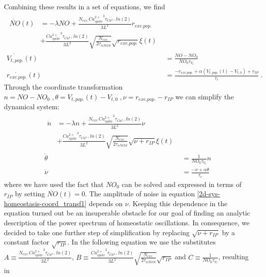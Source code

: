 \documentclass[10pt,a4paper]{article}
\begin{document}
Combining these results in a set of equations, we find
\begin{align}
\begin{split}
\dot{NO}(t) &= - \lambda NO + \frac{ N_{exc.} {Ca^{2+}_{spike}}^3 \tau_{Ca^{2+}}ln(2)}{3 L^2}r_{exc.pop.} \\
&+ \frac{{Ca^{2+}_{spike}}^3 {\tau_{Ca^{2+}}} ln(2)}{3L^2}\sqrt{\frac{N_{exc.}}{2 \tau_{nNOS}}}\sqrt{r_{exc.pop.}}\xi (t)
\end{split}\label{2d-sys-homeostasis1}\\
\dot{V_{t,pop.}}(t) &= \frac{NO-NO_0}{NO_0 \tau_{V_t}} \label{2d-sys-homeostasis2} \\
\dot{r_{exc.pop.}}(t) &= \frac{-r_{exc.pop.}+\alpha(V_{t,pop.}(t)-V_{t,0}) + r_{IP}}{\tau_r}\;. \label{2d-sys-homeostasis3}
\end{align}
Through the coordinate transformation $n = NO-NO_0 \; , \theta = V_{t,pop.}(t)-V_{t,0}\; , \nu = r_{exc.pop.} - r_{IP}$ we can simplify the dynamical system:
\begin{align}
\begin{split}
\dot{n} &= -\lambda n + \frac{N_{exc.} {Ca^{2+}_{spike}}^3 \tau_{Ca^{2+}}ln(2)}{3 L^2}\nu \\
&+ \frac{{Ca^{2+}_{spike}}^3 {\tau_{Ca^{2+}}} ln(2)}{3L^2}\sqrt{\frac{N_{exc.}}{2 \tau_{nNOS}}}\sqrt{\nu + r_{IP}}\xi (t)
\end{split}\label{2d-sys-homeostasis-coord_transf1}\\
\dot{\theta} &= \frac{1}{NO_0 \tau_{V_t}} n \label{2d-sys-homeostasis-coord_transf2} \\
\dot{\nu} &= \frac{-\nu + \alpha \theta}{\tau_r} \label{2d-sys-homeostasis-coord_transf3}
\end{align}
where we have used the fact that $NO_0$ can be solved and expressed in terms of $r_{IP}$ by setting $\dot{NO}(t) = 0$. The amplitude of noise in equation \ref{2d-sys-homeostasis-coord_transf1} depends on $\nu$. Keeping this dependence in the equation turned out be an insuperable obstacle for our goal of finding an analytic description of the power spectrum of homeostatic oscillations. In consequence, we decided to take one further step of simplification by replacing $\sqrt{\nu + r_{IP}}$ by a constant factor $\sqrt{r_{IP}}$. In the following equation we use the substitutes $A\equiv \frac{N_{exc.} {Ca^{2+}_{spike}}^3 \tau_{Ca^{2+}}ln(2)}{3 L^2}$, $B\equiv \frac{{Ca^{2+}_{spike}}^3 {\tau_{Ca^{2+}}} ln(2)}{3L^2}\sqrt{\frac{N_{exc.}}{2 \tau_{nNOS}}}\sqrt{r_{IP}}$ and $C\equiv \frac{1}{NO_0 \tau_{V_t}}$, resulting in
\end{document}
